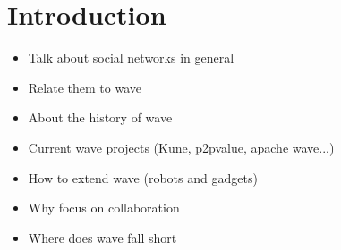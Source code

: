 \newpage
{}
\section{Introduction}

\begin{itemize}
  \item Talk about social networks in general
  \item Relate them to wave
  \item About the history of wave
  \item Current wave projects (Kune, p2pvalue, apache wave...)
  \item How to extend wave (robots and gadgets)
  \item Why focus on collaboration
  \item Where does wave fall short  
\end{itemize}
